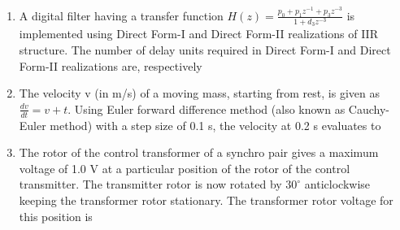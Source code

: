 \documentclass[journal,12pt,onecolumn]{IEEEtran}
\theoremstyle{remark}
\begin{document}
\begin{enumerate}
\vspace{0.5cm}

\item A digital filter having a transfer function $H(z) = \frac{p_0 + p_1 z^{-1} + p_3 z^{-3}}{1 + d_3 z^{-3}}$ is implemented using Direct Form-I and Direct Form-II realizations of IIR structure. The number of delay units required in Direct Form-I and Direct Form-II realizations are, respectively
\hfill{}\begin{enumerate}  \end{enumerate}

\vspace{0.5cm}

\item The velocity v (in m/s) of a moving mass, starting from rest, is given as $\frac{dv}{dt} = v+t$. Using Euler forward difference method (also known as Cauchy-Euler method) with a step size of 0.1 s, the velocity at 0.2 s evaluates to
\hfill{}\begin{enumerate}  \end{enumerate}

\vspace{0.5cm}

\item The rotor of the control transformer of a synchro pair gives a maximum voltage of 1.0 V at a particular position of the rotor of the control transmitter. The transmitter rotor is now rotated by $30^\circ$ anticlockwise keeping the transformer rotor stationary. The transformer rotor voltage for this position is
\hfill{}\begin{enumerate}  \end{enumerate}


\end{enumerate}
\end{document}
